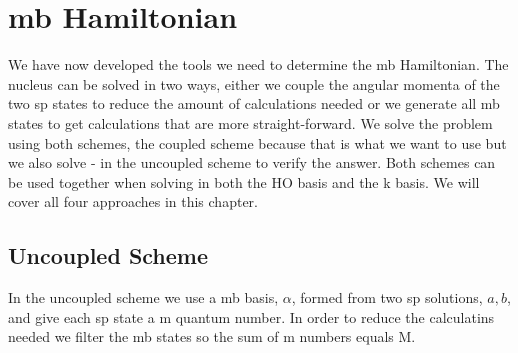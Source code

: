 


\section{mb Hamiltonian}
We have now developed the tools we need to determine the mb Hamiltonian. 
The  nucleus can be solved in two ways, either we couple the angular momenta of the two sp states to reduce the amount of calculations needed or we generate all mb states to get calculations that are more straight-forward. 
We solve the problem using both schemes, the coupled scheme because that is what we want to use but we also solve - in the uncoupled scheme to verify the answer. 
Both schemes can be used together when solving in both the HO basis and the k basis. 
We will cover all four approaches in this chapter.

\subsection{Uncoupled Scheme}
In the uncoupled scheme we use a mb basis, $\alpha$, formed from two sp solutions, $a,b$, and give each sp state a m quantum number. In order to reduce the calculatins needed we filter the mb states so the sum of m numbers equals M.

